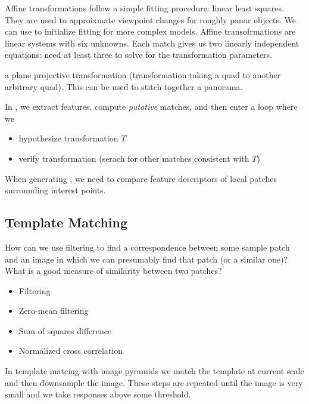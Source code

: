 \documentclass{article}
\begin{document}
Affine transformations follow a simple fitting procedure: linear least squares. They are used to approixmate viewpoint changes for roughly panar objects. We can use to initialize fitting for more complex models. Affine transofrmations are linear systems with six unknowns. Each match gives us two linearly independent equations: need at least three to solve for the transformation parameters. \\ 

\begin{definition}[Homography]
  a plane projective transformation (transformation taking a quad to another arbitrary quad). This can be used to stitch together a panorama. 
\end{definition}

In , we extract features, compute \emph{putative} matches, and then enter a loop where we 
\begin{itemize}
  \item hypothesize transformation $T$ 
  \item verify transformation (serach for other matches consistent with $T$)
\end{itemize}
When generating , we need to compare feature descriptors of local patches surrounding interest points. 

\subsection{Template Matching}

How can we use filtering to find a correspondence between some sample patch and an image in which we can presumably find that patch (or a similar one)? \\ 

What is a good measure of similarity between two patches? 
\begin{itemize}
  \item Filtering 
  \item Zero-mean filtering 
  \item Sum of squares difference 
  \item Normalized cross correlation
\end{itemize}

In template matcing with image pyramids we match the template at current scale and then downsample the image. These steps are repeated until the image is very small and we take responses above some threshold. 
\end{document}

